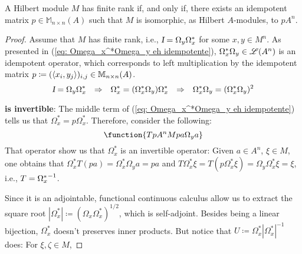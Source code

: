 \begin{teorema}\label{teo: M rank finito sse M = pA^n}
A Hilbert module $M$ has finite rank if, and only if, there exists an idempotent matrix $p\in \mathbb M_{n\times n}(A)$ such that $M$ is isomorphic, as Hilbert $A$-modules, to $p A^{n}$.
\begin{proof}
Assume that $M$ has finite rank, i.e., $\textsl{I} = \Omega_y\Omega_x^*$ for some $x,y \in M^n$. As presented in (\ref{eq: Omega_x^*Omega_y eh idempotente}), $\Omega_x^*\Omega_y \in \mathscr L(A^n)$ is an idempotent operator, which corresponds to left multiplication by the idempotent matrix $p\coloneqq (\langle {x_i},{y_j}\rangle)_{i,j} \in \mathbb M_{n\times n}(A)$.
\begin{equation}
\label{eq: Omega_x^*Omega_y eh idempotente}
    \textsl{I} = \Omega_y \Omega_x^* \hspace{0.25cm} \Rightarrow \hspace{0.25cm} \Omega_x^* = (\Omega_x^*\Omega_y) \Omega_x^* \hspace{0.25cm} \Rightarrow \hspace{0.25cm} \Omega_x^*\Omega_y = (\Omega_x^*\Omega_y)^2
\end{equation}
\begin{itroman}
    \item[]  \textbf{is invertible}: The middle term of (\ref{eq: Omega_x^*Omega_y eh idempotente}) tells us that $\Omega_x^*= p\Omega_x^* $. Therefore, consider the following:
\begin{equation*}
    \function{T{pA^n}{M}{pa}{\Omega_ya}}
\end{equation*}
That operator show us that $\Omega_x^*$ is an invertible operator: Given $a\in A^n$, $\xi \in M$,  one obtains that $\Omega_x^* T(pa) = \Omega_x^*\Omega_ya = pa$ and $T\Omega_x^* \xi = T(p\Omega_x^*\xi) = \Omega_y\Omega_x^*\xi = \xi$, i.e., $T = {\Omega_x^*}^{-1}$.
\end{itroman}
Since it is an adjointable, functional continuous calculus allow us to extract the square root $|\Omega_x^*| \coloneqq (\Omega_x\Omega_x^*)^{1/2}$, which is self-adjoint. Besides being a linear bijection, $\Omega_x^*$ doesn't preserves inner products. But notice that $U \coloneqq \Omega_x^*|\Omega_x^*|^{-1}$ does: For $\xi,\zeta \in M$,

\end{proof}
\end{teorema}
